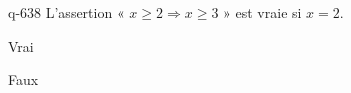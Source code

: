 \begin{truefalse}{q-638}
L'assertion « $x\geq 2 \Rightarrow x \geq 3$ » est vraie si $x=2$.
\item Vrai
\item* Faux
\end{truefalse}

